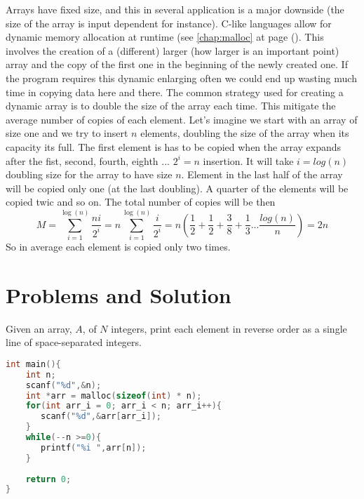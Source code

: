 Arrays have fixed size, and this in several application is a major downside (the size of the array is input dependent for instance). C-like languages allow for dynamic memory allocation at runtime (see \ref{chap:malloc} at page (). This involves the creation of a (different) larger (how larger is an important point) array and the copy of the first one in the beginning of the newly created one. If the program requires this dynamic enlarging often we could end up wasting much time in copying data here and there.
The common strategy used for creating a dynamic array is to double the size of the array each time. This mitigate the average number of copies of each element. Let's imagine we start with an array of size one and we try to insert $n$ elements, doubling the size of the array when its capacity its full. The first element is has to be copied when the array expands after the fist, second, fourth, eighth ... $2^i = n$ insertion.
It will take $i = log(n)$ doubling size for the array to have size $n$. Element in the last half of the array will be copied only one (at the last doubling). A quarter of the elements will be copied twic and so on. The total number of copies will be then
\[
M = \sum_{i=1}^{\log(n)} \frac{ni}{2^i} = n\sum_{i=1}^{\log(n)} \frac{i}{2^i} = n(\frac{1}{2}+\frac{1}{2} + \frac{3}{8} + \frac{1}{3} ... \frac{log(n)}{n})=2n
\]
So in average  each element is copied only two times.

 \section{Problems and Solution}

\begin{problem}
Given an array, $A$, of $N$ integers, print each element in reverse order as a single line of space-separated integers.
\end{problem}	

\begin{solution}

		\begin{lstlisting}[language=C, caption="C"]
        int main(){
    int n; 
    scanf("%d",&n);
    int *arr = malloc(sizeof(int) * n);
    for(int arr_i = 0; arr_i < n; arr_i++){
       scanf("%d",&arr[arr_i]);
    }
    while(--n >=0){
       printf("%i ",arr[n]);
    }
    
    return 0;
}

		\end{lstlisting}  

\end{solution}	
 
